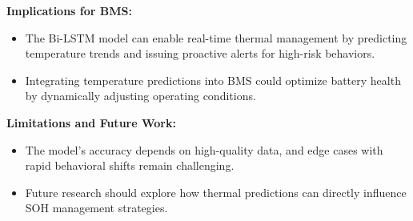 \textbf{Implications for \gls{BMS}:}
\begin{itemize}
    \item The Bi-LSTM model can enable real-time thermal management by predicting temperature trends and issuing proactive alerts for high-risk behaviors.
    \item Integrating temperature predictions into \gls{BMS} could optimize battery health by dynamically adjusting operating conditions.
\end{itemize}

\textbf{Limitations and Future Work:}
\begin{itemize}
    \item The model's accuracy depends on high-quality data, and edge cases with rapid behavioral shifts remain challenging.
    \item Future research should explore how thermal predictions can directly influence \gls{SOH} management strategies.
\end{itemize}




\endinput